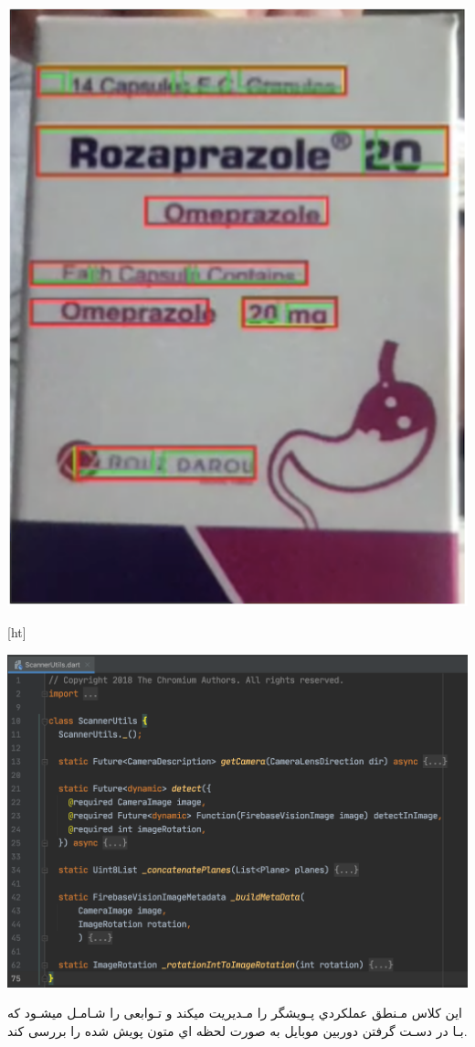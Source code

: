 \begin{center}
\includegraphics[scale=0.7]{front/template/images/text-detector.png}
\end{center}


[ht]
\begin{center}
\includegraphics[scale=0.6]{front/template/images/scanner-utils.png}
\end{center}
این کلاس مـنطق عملکردي پـویشگر را مـدیریت میکند و تـوابعی را شـامـل میشـود که بـا در دسـت گرفتن دوربین موبایل به صورت لحظه اي متون پویش شده را بررسی کند.

